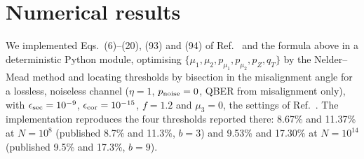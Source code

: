 \documentclass[aps,pra,twocolumn,superscriptaddress,nofootinbib]{revtex4-2}
\begin{document}
\section{Numerical results}\label{sec:num}
We implemented Eqs.~(6)--(20), (93) and (94) of Ref.~\cite{T25} and the formula above in a deterministic Python module, optimising $\{\mu_1,\mu_2,p_{\mu_1},p_{\mu_2},p_Z,q_T\}$ by the Nelder--Mead method and locating thresholds by bisection in the misalignment angle for a lossless, noiseless channel ($\eta=1$, $p_{\rm noise}=0$, QBER from misalignment only), with $\epsilon_{\rm sec}=10^{-9}$, $\epsilon_{\rm cor}=10^{-15}$, $f=1.2$ and $\mu_3=0$, the settings of Ref.~\cite{T25}. The implementation reproduces the four thresholds reported there: 8.67\% and 11.37\% at $N=10^8$ (published 8.7\% and 11.3\%, $b=3$) and 9.53\% and 17.30\% at $N=10^{14}$ (published 9.5\% and 17.3\%, $b=9$).
\end{document}
